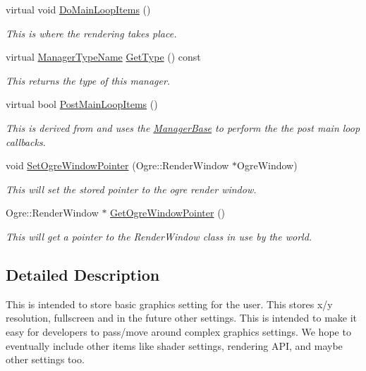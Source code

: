 \begin{DoxyCompactItemize}
virtual void \hyperlink{classphys_1_1GraphicsManager_a72e5dc563c6947cded348f19d3df41ee}{DoMainLoopItems} ()
\begin{DoxyCompactList}\small\item\em This is where the rendering takes place. \item\end{DoxyCompactList}\item 
virtual \hyperlink{classphys_1_1ManagerBase_aaa6ccddf23892eaccb898529414f80a5}{ManagerTypeName} \hyperlink{classphys_1_1GraphicsManager_abf48faad2e09cd564442e66bc0473e58}{GetType} () const 
\begin{DoxyCompactList}\small\item\em This returns the type of this manager. \item\end{DoxyCompactList}\item 
virtual bool \hyperlink{classphys_1_1GraphicsManager_ae2330172be150cd4d12aa2ed62b0474c}{PostMainLoopItems} ()
\begin{DoxyCompactList}\small\item\em This is derived from and uses the \hyperlink{classphys_1_1ManagerBase}{ManagerBase} to perform the the post main loop callbacks. \item\end{DoxyCompactList}\item 
void \hyperlink{classphys_1_1GraphicsManager_ae08ff0d9f16d7b9bc35d2399c1389e6a}{SetOgreWindowPointer} (Ogre::RenderWindow $\ast$OgreWindow)
\begin{DoxyCompactList}\small\item\em This will set the stored pointer to the ogre render window. \item\end{DoxyCompactList}\item 
Ogre::RenderWindow $\ast$ \hyperlink{classphys_1_1GraphicsManager_a56d2f5d2ad9fb277723facd7f54034ec}{GetOgreWindowPointer} ()
\begin{DoxyCompactList}\small\item\em This will get a pointer to the RenderWindow class in use by the world. \item\end{DoxyCompactList}\end{DoxyCompactItemize}


\subsection{Detailed Description}
This is intended to store basic graphics setting for the user. This stores x/y resolution, fullscreen and in the future other settings. This is intended to make it easy for developers to pass/move around complex graphics settings. We hope to eventually include other items like shader settings, rendering API, and maybe other settings too. 

